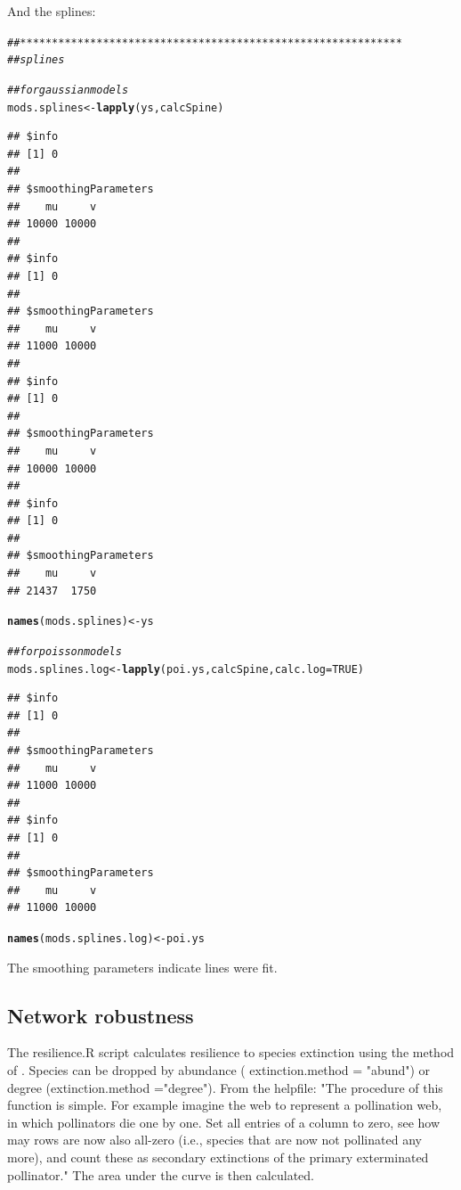 \documentclass{article}\usepackage[]{graphicx}\usepackage[]{color}
\makeatletter
\newcommand{\hlnum}[1]{\textcolor[rgb]{0.686,0.059,0.569}{#1}}%
\newcommand{\hlcom}[1]{\textcolor[rgb]{0.678,0.584,0.686}{\textit{#1}}}%
\newcommand{\hlstd}[1]{\textcolor[rgb]{0.345,0.345,0.345}{#1}}%
\newcommand{\hlkwb}[1]{\textcolor[rgb]{0.69,0.353,0.396}{#1}}%
\newcommand{\hlkwc}[1]{\textcolor[rgb]{0.333,0.667,0.333}{#1}}%
\newcommand{\hlkwd}[1]{\textcolor[rgb]{0.737,0.353,0.396}{\textbf{#1}}}%
\newenvironment{kframe}{%
 \def\at@end@of@kframe{}%
 \ifinner\ifhmode%
  \def\at@end@of@kframe{\end{minipage}}%
  \begin{minipage}{\columnwidth}%
 \fi\fi%
 \def\FrameCommand##1{\hskip\@totalleftmargin \hskip-\fboxsep
 \colorbox{shadecolor}{##1}\hskip-\fboxsep
     \hskip-\linewidth \hskip-\@totalleftmargin \hskip\columnwidth}%
 \MakeFramed {\advance\hsize-\width
   \@totalleftmargin\z@ \linewidth\hsize
   \@setminipage}}%
 {\par\unskip\endMakeFramed%
 \at@end@of@kframe}
\newenvironment{knitrout}{}{} %
\makeatother
\begin{document}
And the splines:
\begin{knitrout}
\color{fgcolor}\begin{kframe}
\begin{alltt}
\hlcom{## ************************************************************}
\hlcom{## splines}

\hlcom{## for gaussian models}
\hlstd{mods.splines} \hlkwb{<-} \hlkwd{lapply}\hlstd{(ys, calcSpine)}
\end{alltt}
\begin{verbatim}
## $info
## [1] 0
## 
## $smoothingParameters
##    mu     v 
## 10000 10000 
## 
## $info
## [1] 0
## 
## $smoothingParameters
##    mu     v 
## 11000 10000 
## 
## $info
## [1] 0
## 
## $smoothingParameters
##    mu     v 
## 10000 10000 
## 
## $info
## [1] 0
## 
## $smoothingParameters
##    mu     v 
## 21437  1750
\end{verbatim}
\begin{alltt}
\hlkwd{names}\hlstd{(mods.splines)} \hlkwb{<-} \hlstd{ys}

\hlcom{## for poisson models}
\hlstd{mods.splines.log} \hlkwb{<-} \hlkwd{lapply}\hlstd{(poi.ys, calcSpine,} \hlkwc{calc.log}\hlstd{=}\hlnum{TRUE}\hlstd{)}
\end{alltt}
\begin{verbatim}
## $info
## [1] 0
## 
## $smoothingParameters
##    mu     v 
## 11000 10000 
## 
## $info
## [1] 0
## 
## $smoothingParameters
##    mu     v 
## 11000 10000
\end{verbatim}
\begin{alltt}
\hlkwd{names}\hlstd{(mods.splines.log)} \hlkwb{<-} \hlstd{poi.ys}
\end{alltt}
\end{kframe}
\end{knitrout}

The smoothing parameters indicate lines were fit.

\subsection{Network robustness}




The resilience.R script calculates resilience to species extinction
using the method of \citep{Memmott2004}. Species can be dropped by
abundance ( extinction.method = "abund") or degree (extinction.method
="degree"). From the helpfile: "The procedure of this function is
simple. For example imagine the web to represent a pollination web, in
which pollinators die one by one. Set all entries of a column to zero,
see how may rows are now also all-zero (i.e., species that are now not
pollinated any more), and count these as secondary extinctions of the
primary exterminated pollinator." The area under the curve is then
calculated.
\end{document}
